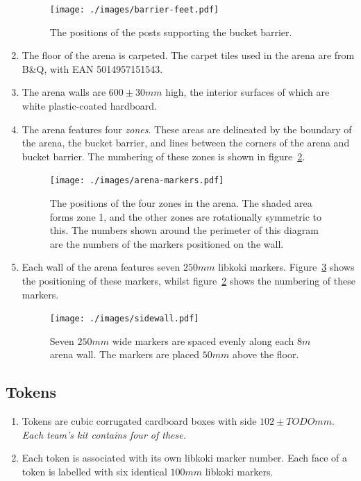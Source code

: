 \begin{enumerate}
  \begin{figure}
    \centering
    \texttt{[image: ./images/barrier-feet.pdf]}
    \caption{The positions of the posts supporting the bucket barrier.}
    \label{fig:bucket-barrier-legs}
  \end{figure}

\item The floor of the arena is carpeted.  The carpet tiles used in the arena are from B\&Q, with EAN 5014957151543.

\item The arena walls are $600\pm30mm$ high, the interior surfaces of which are white plastic-coated hardboard.

\item The arena features four \textit{zones}.  These areas are delineated by the boundary of the arena, the bucket barrier, and lines between the corners of the arena and bucket barrier.  The numbering of these zones is shown in figure~\ref{fig:arena-zones}.

  \begin{figure}
    \centering
    \texttt{[image: ./images/arena-markers.pdf]}
    \caption{The positions of the four zones in the arena.  The shaded area forms zone 1, and the other zones are rotationally symmetric to this.  The numbers shown around the perimeter of this diagram are the numbers of the markers positioned on the wall.}
    \label{fig:arena-zones}
  \end{figure}

\item Each wall of the arena features seven $250mm$ libkoki markers.  Figure~\ref{fig:arena-wall} shows the positioning of these markers, whilst figure~\ref{fig:arena-zones} shows the numbering of these markers.

  \begin{figure}
    \centering
    \texttt{[image: ./images/sidewall.pdf]}
    \caption{Seven $250mm$ wide markers are spaced evenly along each $8m$ arena wall.  The markers are placed $50mm$ above the floor.}
    \label{fig:arena-wall}
  \end{figure}

\end{enumerate}

\subsection{Tokens}
\label{sub:Tokens}
\begin {enumerate}
\item Tokens are cubic corrugated cardboard boxes with side $102 \pm TODO mm$.
\emph{Each team's kit contains four of these.}

\item Each token is associated with its own libkoki marker number.  Each face of a token is labelled with six identical $100mm$ libkoki markers.
\end {enumerate}

